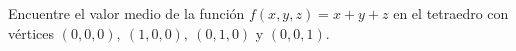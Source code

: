 \item Encuentre el valor medio de la función $f(x, y, z) = x + y + z$ en el tetraedro con vértices $(0, 0, 0), \ (1, 0, 0), \ (0, 1, 0)$ y $(0, 0, 1)$.
